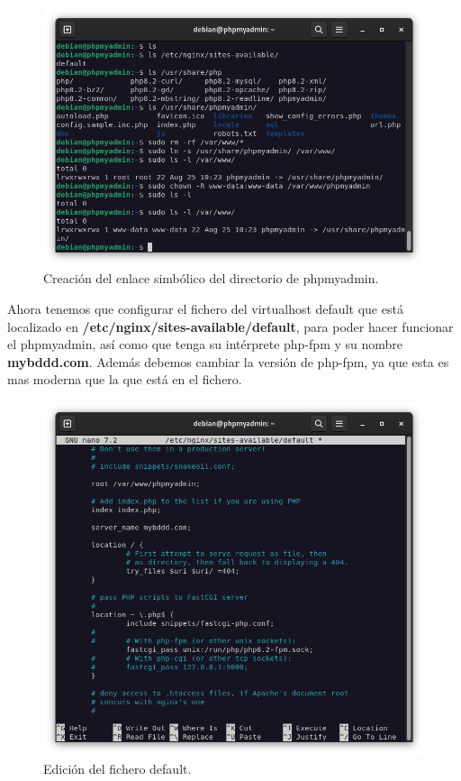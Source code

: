 \begin{figure}[H]
	\centering
	\includegraphics[scale=0.30]{06}
	\caption{Creación del enlace simbólico del directorio de phpmyadmin.}
\end{figure}

Ahora tenemos que configurar el fichero del virtualhost default que está localizado en \textbf{/etc/nginx/sites-available/default}, para poder hacer funcionar el phpmyadmin, así como que tenga su intérprete php-fpm y su nombre \textbf{mybddd.com}. Además debemos cambiar la versión de php-fpm, ya que esta es mas moderna que la que está en el fichero.

\begin{figure}[H]
	\centering
	\includegraphics[scale=0.30]{07}
	\caption{Edición del fichero default.}
\end{figure}

